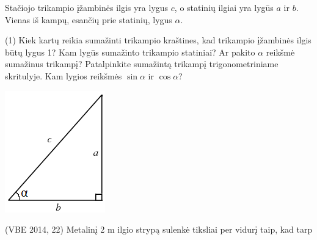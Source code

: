 \documentclass[a4paper]{article}
\begin{document}
\begin{mdframed}[backgroundcolor=blue!10!white, linewidth=3pt]
\begin{enumerate}
\begin{minipage}[b]{0.13\linewidth}
\end{minipage}
\item[]
\begin{minipage}[b]{0.8\linewidth}
\item Stačiojo trikampio įžambinės ilgis yra lygus $c$, o statinių ilgiai yra lygūs $a$ ir $b$. Vienas iš kampų, esančių prie statinių, lygus $\alpha$. 
\begin{tasks}(1)
\task Kiek kartų reikia sumažinti trikampio kraštines, kad trikampio įžambinės ilgis būtų lygus 1?
\task Kam lygūs sumažinto trikampio statiniai?
\task Ar pakito $\alpha$ reikšmė sumažinus trikampį?
\task Patalpinkite sumažintą trikampį trigonometriniame skritulyje. Kam lygios reikšmės $\sin{\alpha}$ ir $\cos{\alpha}$?
\end{tasks}
\end{minipage}
\begin{minipage}[b]{0.2\linewidth}
\includegraphics[width=\textwidth]{transtriangle.png}
\end{minipage}
\begin{minipage}[b]{0.77\linewidth}
\item (VBE 2014, 22) Metalinį 2 m ilgio strypą sulenkė tiksliai per vidurį taip, kad tarp

\end{minipage}
\end{enumerate}
\end{mdframed}
\end{document}
